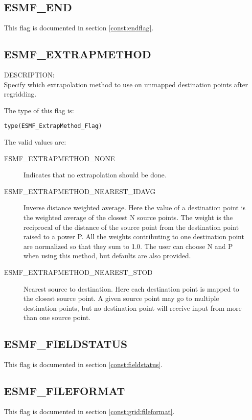 \subsection{ESMF\_END}

This flag is documented in section \ref{const:endflag}.

\subsection{ESMF\_EXTRAPMETHOD}
\label{opt:extrapmethod}

{\sf DESCRIPTION:\\}  
Specify which extrapolation method to use on unmapped destination points after regridding. 

The type of this flag is:

{\tt type(ESMF\_ExtrapMethod\_Flag)}

The valid values are:
\begin{description}
\item [ESMF\_EXTRAPMETHOD\_NONE]
     Indicates that no extrapolation should be done. 
\item [ESMF\_EXTRAPMETHOD\_NEAREST\_IDAVG]
      Inverse distance weighted average. 
      Here the value of a destination point is the weighted average of the closest N source points. The weight is 
      the reciprocal of the distance of the source point from the destination point raised to a power P. All the
      weights contributing to one destination point are normalized so that they sum to 1.0. 
      The user can choose N and P when using this method, but defaults are also provided.  
\item [ESMF\_EXTRAPMETHOD\_NEAREST\_STOD]
      Nearest source to destination. 
      Here each destination point is mapped to the closest source point. A given source point may go to multiple destination points, but no destination point will receive input from more than one source point. 

\end{description}

\subsection{ESMF\_FIELDSTATUS}
This flag is documented in section \ref{const:fieldstatus}.

\subsection{ESMF\_FILEFORMAT}
This flag is documented in section \ref{const:grid:fileformat}.

